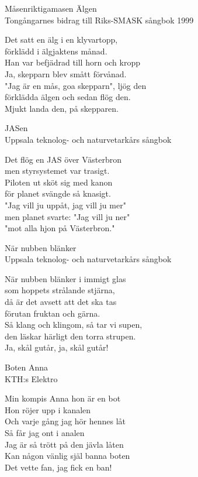 \begin{song}{Måsen}{riktigamasen}
  {\Large Älgen}\\{\tiny  Tongångarnes bidrag till Riks-SMASK sångbok 1999}
  \begin{vers}
Det satt en älg i en klyvartopp, \\
förklädd i älgjaktens månad. \\
Han var befjädrad till horn och kropp \\
Ja, skepparn blev smått förvånad. \\
"Jag är en mås, goa skepparn", ljög den \\
förklädda älgen och sedan flög den. \\
Mjukt landa den, på skepparen. \\
\end{vers}
 

  {\Large JASen}\\{\tiny  Uppsala teknolog- och naturvetarkårs sångbok}
  \begin{vers}
Det flög en JAS över Västerbron \\
men styrsystemet var trasigt. \\
Piloten ut sköt sig med kanon \\
för planet svängde så knasigt. \\
"Jag vill ju uppåt, jag vill ju mer" \\
men planet svarte: "Jag vill ju ner" \\
"mot alla hjon på Västerbron." \\
\end{vers}
 
\newpage
  {\Large När nubben blänker}\\{\tiny  Uppsala teknolog- och naturvetarkårs sångbok}
  \begin{vers}
När nubben blänker i immigt glas \\
som hoppets strålande stjärna, \\
då är det avsett att det ska tas \\
förutan fruktan och gärna. \\
Så klang och klingom, så tar vi supen, \\
den läskar härligt den torra strupen. \\
Ja, skål gutår, ja, skål gutår! \\
\end{vers}
 

  {\Large Boten Anna}\\{\tiny  KTH:s Elektro}
  \begin{vers}
Min kompis Anna hon är en bot \\
Hon röjer upp i kanalen \\
Och varje gång jag hör hennes låt \\
Så får jag ont i analen\\ 
Jag är så trött på den jävla låten \\
Kan någon vänlig själ banna boten \\
Det vette fan, jag fick en ban! \\
\end{vers}



\end{song}
